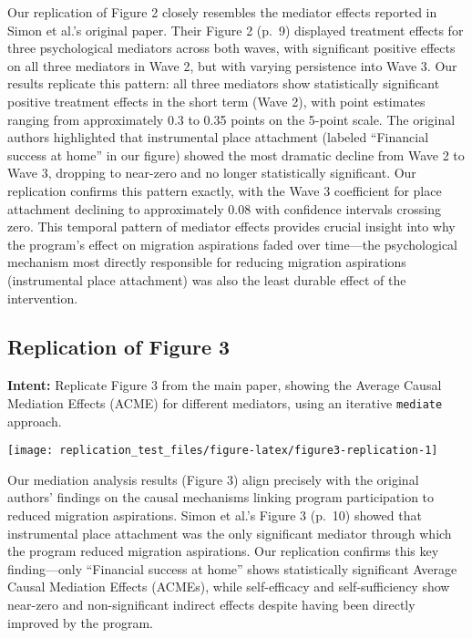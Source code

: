 \documentclass[
]{article}
\begin{document}
Our replication of Figure 2 closely resembles the mediator effects
reported in Simon et al.'s original paper. Their Figure 2 (p.~9)
displayed treatment effects for three psychological mediators across
both waves, with significant positive effects on all three mediators in
Wave 2, but with varying persistence into Wave 3. Our results replicate
this pattern: all three mediators show statistically significant
positive treatment effects in the short term (Wave 2), with point
estimates ranging from approximately 0.3 to 0.35 points on the 5-point
scale. The original authors highlighted that instrumental place
attachment (labeled ``Financial success at home'' in our figure) showed
the most dramatic decline from Wave 2 to Wave 3, dropping to near-zero
and no longer statistically significant. Our replication confirms this
pattern exactly, with the Wave 3 coefficient for place attachment
declining to approximately 0.08 with confidence intervals crossing zero.
This temporal pattern of mediator effects provides crucial insight into
why the program's effect on migration aspirations faded over time---the
psychological mechanism most directly responsible for reducing migration
aspirations (instrumental place attachment) was also the least durable
effect of the intervention.

\subsection{Replication of Figure 3}\label{replication-of-figure-3}

\textbf{Intent:} Replicate Figure 3 from the main paper, showing the
Average Causal Mediation Effects (ACME) for different mediators, using
an iterative \texttt{mediate} approach.

\begin{center}\texttt{[image: replication\_test\_files/figure-latex/figure3-replication-1]} \end{center}

Our mediation analysis results (Figure 3) align precisely with the
original authors' findings on the causal mechanisms linking program
participation to reduced migration aspirations. Simon et al.'s Figure 3
(p.~10) showed that instrumental place attachment was the only
significant mediator through which the program reduced migration
aspirations. Our replication confirms this key finding---only
``Financial success at home'' shows statistically significant Average
Causal Mediation Effects (ACMEs), while self-efficacy and
self-sufficiency show near-zero and non-significant indirect effects
despite having been directly improved by the program.
\end{document}
